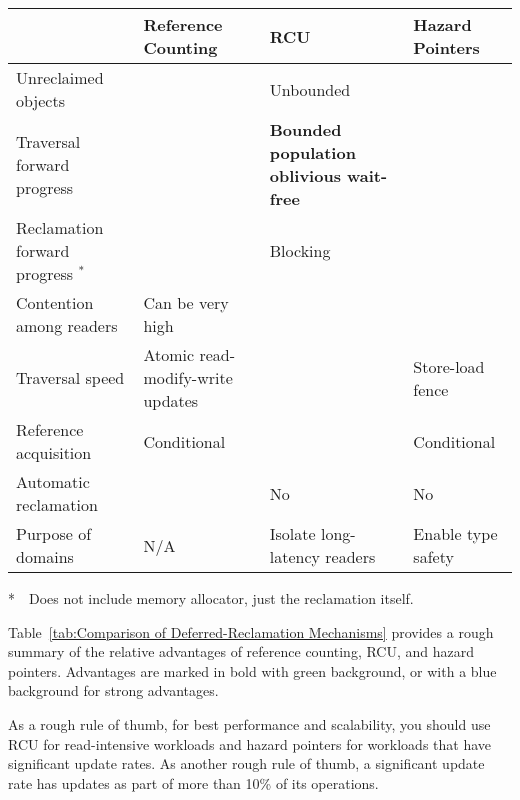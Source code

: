 \documentclass[letterpaper,twocolumn,10pt]{article}
\begin{document}
\begin{table*}
\small
\centering
\begin{tabular}{l|p{1.5in}|p{1.5in}|p{1.5in}}
	& Reference Counting & RCU & Hazard Pointers \\
	\hline
	\hline
	Unreclaimed objects
		& \cellcolor{green!30}{\bf Bounded}
			& Unbounded
				& \cellcolor{green!30}{\bf Bounded} \\
	\hline
	Traversal forward progress
		& \cellcolor{green!30}{\bf Lock-free}
			& \cellcolor{blue!20}
			  {\bf Bounded population oblivious wait-free}
				& \cellcolor{green!30}{\bf Lock-free} \\
	\hline
	Reclamation forward progress $^*$
		& \cellcolor{blue!20}{\bf Bounded wait-free}
			& Blocking
				& \cellcolor{blue!20}{\bf Bounded wait-free} \\
	\hline
	Contention among readers
		& Can be very high
			& \cellcolor{green!30}{\bf No contention}
				& \cellcolor{green!30}{\bf No contention} \\
	\hline
	Traversal speed
		& Atomic read-modify-write updates
			& \cellcolor{green!30}{\bf No or low overhead}
				& Store-load fence \\
	\hline
	Reference acquisition
		& Conditional
			& \cellcolor{green!30}{\bf Unconditional}
				& Conditional \\
	\hline
	Automatic reclamation
		& \cellcolor{green!30}{\bf Yes}
			& No
				& No \\
	\hline
	Purpose of domains
		& N/A
			& Isolate long-latency readers
				& Enable type safety \\
\end{tabular}
\caption{Comparison of Deferred-Reclamation Mechanisms}
\label{tab:Comparison of Deferred-Reclamation Mechanisms}

\flushleft
\noindent
*~~Does not include memory allocator, just the reclamation itself.
\end{table*}

Table~\ref{tab:Comparison of Deferred-Reclamation Mechanisms}
provides a rough summary of the relative advantages of reference
counting, RCU, and hazard pointers.
Advantages are marked in bold with green background, or with a blue
background for strong advantages.

As a rough rule of thumb, for best performance and scalability, you
should use RCU for read-intensive workloads and hazard pointers for
workloads that have significant update rates.
As another rough rule of thumb, a significant update rate has updates
as part of more than 10\% of its operations.
\end{document}
